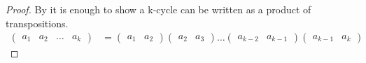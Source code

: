 
\begin{proof}
By  it is enough to show a k-cycle can be written as a product of transpositions.
\begin{align*}
    \begin{pmatrix}a_1 & a_2 & \ldots & a_k \end{pmatrix}
    &= \begin{pmatrix}a_1 & a_2\end{pmatrix} \begin{pmatrix}a_2 & a_3\end{pmatrix} \ldots \begin{pmatrix}a_{k-2} & a_{k-1}\end{pmatrix} \begin{pmatrix}a_{k-1} & a_k\end{pmatrix}
\end{align*}
\end{proof}

